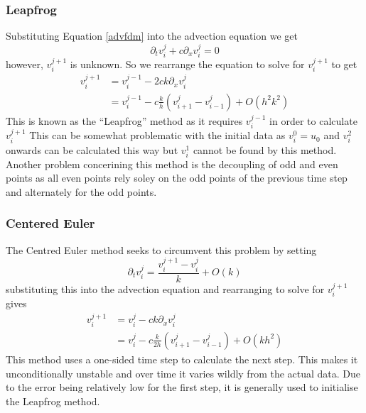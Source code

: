 \subsubsection{Leapfrog}
Substituting Equation \ref{advfdm} into the advection equation we get
\begin{equation}
  \partial_tv_i^j + c\partial_xv_i^j = 0
\end{equation}
however, $v_i^{j+1}$ is unknown. So we rearrange the equation to solve for $v_i^{j+1}$ to get
\begin{equation}
\begin{align}
    v_i^{j+1} &= v_i^{j-1} - 2ck\partial_xv_i^j \\
	      &= v_i^{j-1} - c\frac{k}{h}(v_{i+1}^j - v_{i-1}^j) + O(h^2k^2)
\end{align}
\end{equation}
This is known as the ``Leapfrog'' method as it requires $v_i^{j-1}$ in order to calculate $v_i^{j+1}$ This can be somewhat problematic with the initial data as $v_i^0=u_0$ and $v_i^2$ onwards can be calculated this way but $v_i^1$ cannot be found by this method. Another problem concerining this method is the decoupling of odd and even points as all even points rely soley on the odd points of the previous time step and alternately for the odd points.
\subsubsection{Centered Euler}
The Centred Euler method seeks to circumvent this problem by setting
\begin{equation}
\partial_tv_i^j = \frac{v_i^{j+1} - v_i^j}{k} + O(k) 
\end{equation}
substituting this into the advection equation and rearranging to solve for $v_i^{j+1}$ gives
\begin{equation}
\begin{align}
    v_i^{j+1} &= v_i^j - ck\partial_xv_i^j \\
	      &= v_i^j - c\frac{k}{2h}(v_{i+1}^j - v_{i-1}^j) + O(kh^2)
\end{align}
\end{equation}
This method uses a one-sided time step to calculate the next step. This makes it unconditionally unstable and over time it varies wildly from the actual data. Due to the error being relatively low for the first step, it is generally used to initialise the Leapfrog method.
